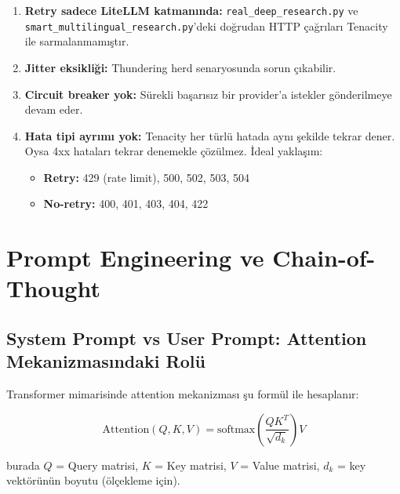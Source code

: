 \begin{enumerate}
  \item \textbf{Retry sadece LiteLLM katman{\i}nda:} \texttt{real\_deep\_research.py} ve \texttt{smart\_multilingual\_research.py}'deki do\u{g}rudan HTTP \c{c}a\u{g}r{\i}lar{\i} Tenacity ile sarmalanmam{\i}\c{s}t{\i}r.

  \item \textbf{Jitter eksikli\u{g}i:} Thundering herd senaryosunda sorun \c{c}{\i}kabilir.

  \item \textbf{Circuit breaker yok:} S\"{u}rekli ba\c{s}ar{\i}s{\i}z bir provider'a istekler g\"{o}nderilmeye devam eder.

  \item \textbf{Hata tipi ayr{\i}m{\i} yok:} Tenacity her t\"{u}rl\"{u} hatada ayn{\i} \c{s}ekilde tekrar dener. Oysa 4xx hatalar{\i} tekrar denemekle \c{c}\"{o}z\"{u}lmez. \.{I}deal yakla\c{s}{\i}m:
  \begin{itemize}[leftmargin=1.5em]
    \item \textbf{Retry:} 429 (rate limit), 500, 502, 503, 504
    \item \textbf{No-retry:} 400, 401, 403, 404, 422
  \end{itemize}
\end{enumerate}


\section{Prompt Engineering ve Chain-of-Thought}
\label{sec:prompt-engineering}

\subsection{System Prompt vs User Prompt: Attention Mekanizmas{\i}ndaki Rol\"{u}}
\label{sec:system-vs-user}

Transformer mimarisinde attention mekanizmas{\i} \c{s}u form\"{u}l ile hesaplan{\i}r:

\begin{equation}
\mathrm{Attention}(Q, K, V) = \mathrm{softmax}\!\left(\frac{QK^T}{\sqrt{d_k}}\right) V
\label{eq:attention}
\end{equation}

burada $Q$ = Query matrisi, $K$ = Key matrisi, $V$ = Value matrisi, $d_k$ = key vekt\"{o}r\"{u}n\"{u}n boyutu (\"{o}l\c{c}ekleme i\c{c}in).

